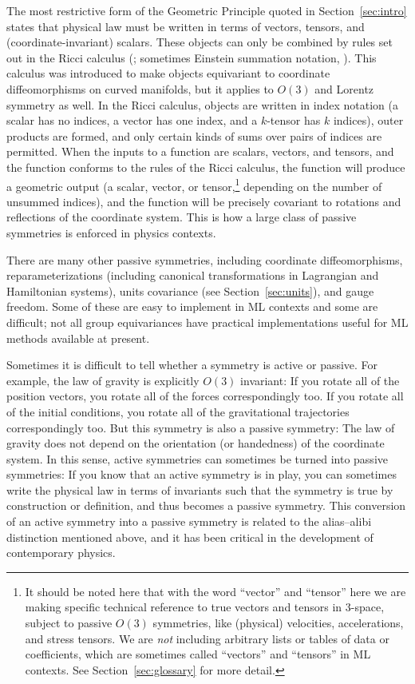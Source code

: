 \documentclass{article} %
\newcommand{\sectionname}{Section}
\newcommand{\secref}[1]{\sectionname~\ref{#1}}
\begin{document}
The most restrictive form of the Geometric Principle quoted in \secref{sec:intro} states that physical law must be written in terms of vectors, tensors, and (coordinate-invariant) scalars.
These objects can only be combined by rules set out in the Ricci calculus (\citealt{ricci}; sometimes Einstein summation notation, \citealt{einstein}).
This calculus was introduced to make objects equivariant to coordinate diffeomorphisms on curved manifolds, but it applies to $O(3)$ and Lorentz symmetry as well.
In the Ricci calculus, objects are written in index notation (a scalar has no indices, a vector has one index, and a $k$-tensor has $k$ indices), outer products are formed, and only certain kinds of sums over pairs of indices are permitted.
When the inputs to a function are scalars, vectors, and tensors, and the function conforms to the rules of the Ricci calculus, the function will produce a geometric output (a scalar, vector, or tensor,\footnote{%
It should be noted here that with the word ``vector'' and ``tensor'' here we are making specific technical reference to true vectors and tensors in 3-space, subject to passive $O(3)$ symmetries, like (physical) velocities, accelerations, and stress tensors.
We are \emph{not} including arbitrary lists or tables of data or coefficients, which are sometimes called ``vectors'' and ``tensors'' in ML contexts. See \secref{sec:glossary} for more detail.} depending on the number of unsummed indices), and the function will be precisely covariant to rotations and reflections of the coordinate system.
This is how a large class of passive symmetries is enforced in physics contexts.

There are many other passive symmetries, including coordinate diffeomorphisms, reparameterizations (including canonical transformations in Lagrangian and Hamiltonian systems), units covariance (see \secref{sec:units}), and gauge freedom.
Some of these are easy to implement in ML contexts and some are difficult;
not all group equivariances have practical implementations useful for ML methods available at present.

Sometimes it is difficult to tell whether a symmetry is active or passive.
For example, the law of gravity is explicitly $O(3)$ invariant:
If you rotate all of the position vectors, you rotate all of the forces correspondingly too.
If you rotate all of the initial conditions, you rotate all of the gravitational trajectories correspondingly too.
But this symmetry is also a passive symmetry:
The law of gravity does not depend on the orientation (or handedness) of the coordinate system.
In this sense, active symmetries can sometimes be turned into passive symmetries:
If you know that an active symmetry is in play, you can sometimes write the physical law in terms of invariants such that the symmetry is true by construction or definition, and thus becomes a passive symmetry.
This conversion of an active symmetry into a passive symmetry is related to the alias--alibi distinction mentioned above, and it has been critical in the development of contemporary physics.
\end{document}
